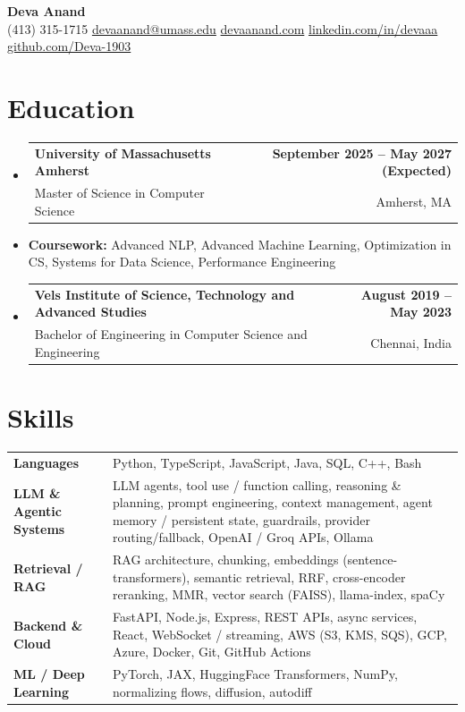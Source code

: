 \documentclass[letterpaper,10pt]{article}
\makeatletter
\newcommand{\resumeSubheading}[4]{
  \vspace{1pt}\item
    \begin{tabular*}{0.985\textwidth}[t]{l@{\extracolsep{\fill}}r}
      \textbf{#1} & \textbf{\small #2} \\
      {\small\color{ResumeSlate} #3} & {\small\color{ResumeSlate} #4} \\
    \end{tabular*}\vspace{-6pt}
}
\newcommand{\resumeSubItem}[1]{\item[]\small{#1\vspace{-1pt}}}
\newcommand{\resumeSubHeadingListStart}{\begin{itemize}[leftmargin=0.0in, label={}, itemsep=2pt, topsep=2pt]}
\newcommand{\resumeSubHeadingListEnd}{\end{itemize}}
\makeatother
\begin{document}
\begin{center}
    {\LARGE \bfseries \textcolor{ResumeNavy}{Deva Anand}} \\ \vspace{4pt}
    \small
    (413) 315-1715 \enspace\textbar\enspace
    \href{mailto:devaanand@umass.edu}{devaanand@umass.edu} \enspace\textbar\enspace
    \href{https://devaanand.com}{devaanand.com} \enspace\textbar\enspace
    \href{https://linkedin.com/in/devaaa/}{linkedin.com/in/devaaa} \enspace\textbar\enspace
    \href{https://github.com/Deva-1903}{github.com/Deva-1903}
    \vspace{-6pt}
\end{center}
\section{Education}
\resumeSubHeadingListStart
  \resumeSubheading
    {University of Massachusetts Amherst}{September 2025 -- May 2027 (Expected)}
    {Master of Science in Computer Science}{Amherst, MA}
  \resumeSubItem{\textbf{Coursework:} Advanced NLP, Advanced Machine Learning, Optimization in CS, Systems for Data Science, Performance Engineering}
  \resumeSubheading
    {Vels Institute of Science, Technology and Advanced Studies}{August 2019 -- May 2023}
    {Bachelor of Engineering in Computer Science and Engineering}{Chennai, India}
\resumeSubHeadingListEnd
\vspace{-4pt}
\section{Skills}
{\small
\begin{tabularx}{0.985\textwidth}{@{}>{\bfseries}p{1.36in}@{\hspace{0.45em}}X@{}}
  Languages & Python, TypeScript, JavaScript, Java, SQL, C++, Bash \\
  LLM \& Agentic Systems & LLM agents, tool use / function calling, reasoning \& planning, prompt engineering, context management, agent memory / persistent state, guardrails, provider routing/fallback, OpenAI / Groq APIs, Ollama \\
  Retrieval / RAG & RAG architecture, chunking, embeddings (sentence-transformers), semantic retrieval, RRF, cross-encoder reranking, MMR, vector search (FAISS), llama-index, spaCy \\
  Backend \& Cloud & FastAPI, Node.js, Express, REST APIs, async services, React, WebSocket / streaming, AWS (S3, KMS, SQS), GCP, Azure, Docker, Git, GitHub Actions \\
  ML / Deep Learning & PyTorch, JAX, HuggingFace Transformers, NumPy, normalizing flows, diffusion, autodiff \\
\end{tabularx}
}
\vspace{-4pt}
\end{document}
